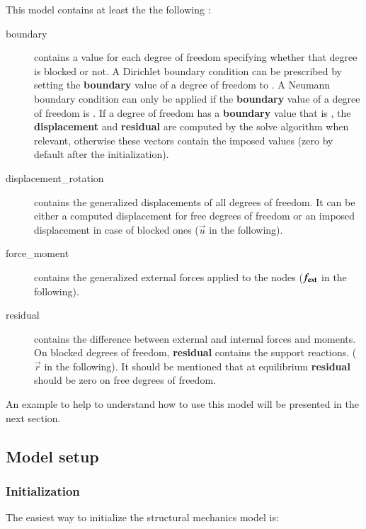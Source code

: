 \vspace{1cm}
This model contains at least the the following :
\begin{description}
\item[boundary]  contains a    value for  each  degree of  freedom
  specifying  whether  that degree  is  blocked  or  not. A  Dirichlet  boundary
  condition can be prescribed by setting the \textbf{boundary} value of a degree
  of freedom to  .  A Neumann boundary condition  can only be applied
  if the  \textbf{boundary} value of a  degree of freedom is  . If a
  degree  of freedom  has a  \textbf{boundary} value  that is  , the
  \textbf{displacement}  and   \textbf{residual}  are  computed   by  the  solve
  algorithm when  relevant, otherwise these  vectors contain the  imposed values
  (zero by default after the initialization).
  
\item[displacement\_rotation]  contains  the  generalized displacements  of  all
  degrees of freedom. It can be  either a computed displacement for free degrees
  of freedom  or an imposed displacement  in case of blocked  ones ($\vec{u}$ in
  the following).
  
\item[force\_moment]  contains the  generalized external  forces applied  to the
  nodes ($\boldsymbol{f_{{\mathrm{ext}}}}$ in the following).
  
\item[residual] contains the difference between external and internal forces and
  moments. On blocked degrees of freedom, \textbf{residual} contains the support
  reactions.   ($\vec{r}$ in  the following).   It should  be mentioned  that at
  equilibrium \textbf{residual} should be zero on free degrees of freedom.
\end{description}

An example to help to understand how  to use this model will be presented in the
next section.

\subsection{Model setup}
\label{sec:structMechMod:setup}

\subsubsection{Initialization}
The easiest way to initialize the structural mechanics model is:
%  
%
%

